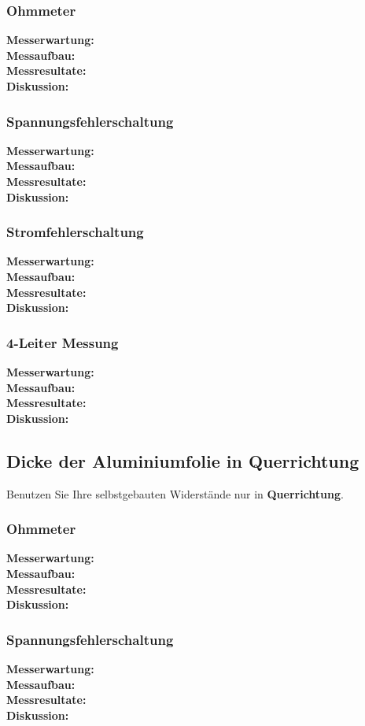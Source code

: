 \subsubsection{Ohmmeter}
\textbf{Messerwartung:}
\\
\textbf{Messaufbau:}
\\
\textbf{Messresultate:}
\\
\textbf{Diskussion:}
\subsubsection{Spannungsfehlerschaltung}
\textbf{Messerwartung:}
\\
\textbf{Messaufbau:}
\\
\textbf{Messresultate:}
\\
\textbf{Diskussion:}
\subsubsection{Stromfehlerschaltung}
\textbf{Messerwartung:}
\\
\textbf{Messaufbau:}
\\
\textbf{Messresultate:}
\\
\textbf{Diskussion:}
\subsubsection{4-Leiter Messung}
\textbf{Messerwartung:}
\\
\textbf{Messaufbau:}
\\
\textbf{Messresultate:}
\\
\textbf{Diskussion:}
\subsection{Dicke der Aluminiumfolie in Querrichtung}
Benutzen Sie Ihre selbstgebauten Widerstände nur in \textbf{Querrichtung}.
\subsubsection{Ohmmeter}
\textbf{Messerwartung:}
\\
\textbf{Messaufbau:}
\\
\textbf{Messresultate:}
\\
\textbf{Diskussion:}
\subsubsection{Spannungsfehlerschaltung}
\textbf{Messerwartung:}
\\
\textbf{Messaufbau:}
\\
\textbf{Messresultate:}
\\
\textbf{Diskussion:}
